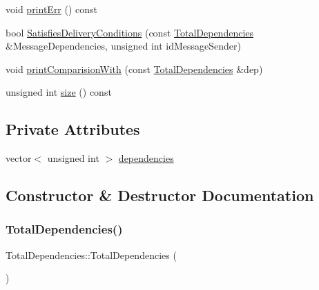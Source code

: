 \begin{DoxyCompactItemize}
\item 
void \hyperlink{classTotalDependencies_a514df10fe452f2000ceec5e279eae802}{print\+Err} () const
\item 
bool \hyperlink{classTotalDependencies_a6d050146cb0298091a4614610997d772}{Satisfies\+Delivery\+Conditions} (const \hyperlink{classTotalDependencies}{Total\+Dependencies} \&Message\+Dependencies, unsigned int id\+Message\+Sender)
\item 
void \hyperlink{classTotalDependencies_a56c23f6400891bc8acb3a2bd03f42b12}{print\+Comparision\+With} (const \hyperlink{classTotalDependencies}{Total\+Dependencies} \&dep)
\item 
unsigned int \hyperlink{classTotalDependencies_a00ea27540cc51d5770d6013a21a41de2}{size} () const
\end{DoxyCompactItemize}
\subsection*{Private Attributes}
\begin{DoxyCompactItemize}
\item 
vector$<$ unsigned int $>$ \hyperlink{classTotalDependencies_a94825b4f782c30dfebf69dd2eba0bb1f}{dependencies}
\end{DoxyCompactItemize}


\subsection{Constructor \& Destructor Documentation}
\mbox{\label{classTotalDependencies_ae066781ee6df2248ee0091a094c1fc1b}} 
\subsubsection{\texorpdfstring{Total\+Dependencies()}{TotalDependencies()}\hspace{0.1cm}{\footnotesize\ttfamily [1/3]}}
{\footnotesize\ttfamily Total\+Dependencies\+::\+Total\+Dependencies (\begin{DoxyParamCaption}{ }\end{DoxyParamCaption})}

\mbox{\label{classTotalDependencies_a8bed75c4fa1477c1a5ca07df4c5191cd}} 
